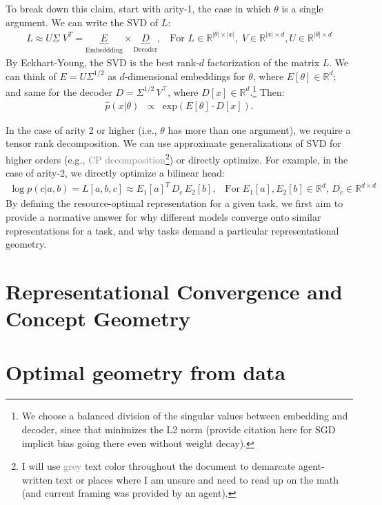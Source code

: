 \documentclass[11pt]{article}
\begin{document}
To break down this claim, start with arity-1, the case in which $\theta$ is a single argument. We can write the SVD of $L$: \begin{align*}
    L \approx U \Sigma \; V^T = \underbrace{E}_{\text{Embeddding}}  \times \underbrace{D}_{\text{Decoder}}, \;\;\;\text{For } L\in \mathbb{R}^{|\theta|\times |x|}, \;V \in \mathbb{R}^{|x|\times d}, U \in \mathbb{R}^{|\theta| \times d}
\end{align*}
By Eckhart-Young, the SVD is the best rank-$d$ factorization of the matrix $L$. We can think of $E=U\Sigma^{1/2}$ as $d$-dimensional embeddings for $\theta$, where $E[\theta] \in \mathbb{R}^d$; and same for the decoder $D = \Sigma^{1/2} \,V^{\top}$, where $D[x] \in\mathbb{R}^d$.\footnote{We choose a balanced division of the singular values between embedding and decoder, since that minimizes the L2 norm (provide citation here for SGD implicit bias going there even without weight decay).} Then: 
\begin{eqnarray*}
    \widehat{p}(x|\theta) & \propto & \mbox{exp}(E[\theta]\cdot D[x]).
\end{eqnarray*} 



In the case of arity 2 or higher (i.e., $\theta$ has more than one argument), we require a tensor rank decomposition. We can use approximate generalizations of SVD for higher orders (e.g., \textcolor{gray}{CP decomposition}\footnote{I will use \textcolor{gray}{grey} text color throughout the document to demarcate agent-written text or places where I am unsure and need to read up on the math (and current framing was provided by an agent).}) or directly optimize. For example, in the case of arity-2, we directly optimize a bilinear head: \begin{align*}
    \log p(c |a,b) = L[a, b, c] \approx E_1[a]^T \,D_c \,E_2[b], \;\;\; \text{For} \; E_1[a], E_2[b] \in \mathbb{R}^d, \,D_c\in \mathbb{R}^{d\times d}
\end{align*}
By defining the resource-optimal representation for a given task, we first aim to provide a normative answer for why different models converge onto similar representations for a task, and why tasks demand a particular representational geometry.

\section{Representational Convergence and Concept Geometry}


\section{Optimal geometry from data}
\end{document}
